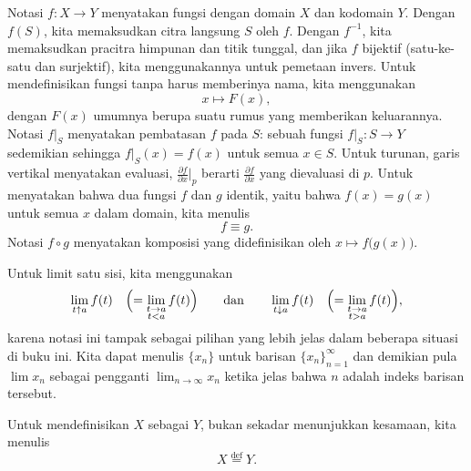 \documentclass[12pt,openany]{book}
\theoremstyle{plain}
\theoremstyle{remark}
\theoremstyle{definition}
\theoremstyle{exercise}
\theoremstyle{example}
\begin{document}
%
Notasi $f \colon X \to Y$ menyatakan fungsi dengan domain $X$ dan
kodomain $Y$.  Dengan $f(S)$, kita memaksudkan citra langsung $S$ oleh $f$.
Dengan $f^{-1}$, kita memaksudkan pracitra himpunan dan
titik tunggal, dan jika $f$ bijektif (satu-ke-satu dan surjektif),
kita menggunakannya untuk pemetaan invers.
Untuk mendefinisikan fungsi tanpa harus memberinya nama, kita menggunakan
%
\begin{equation*}
x \mapsto F(x) ,
\end{equation*}
dengan $F(x)$ umumnya berupa suatu rumus yang memberikan keluarannya.
Notasi
%
$f|_S$
menyatakan pembatasan $f$ pada $S$:
sebuah fungsi
$f|_S \colon S \to Y$ sedemikian sehingga $f|_S(x) = f(x)$ untuk semua $x \in S$.
Untuk turunan, garis vertikal menyatakan evaluasi,
$\frac{\partial f}{\partial x}\big|_p$ berarti
$\frac{\partial f}{\partial x}$ yang dievaluasi di $p$.
Untuk menyatakan bahwa dua fungsi $f$ dan $g$ identik,
yaitu bahwa $f(x) = g(x)$ untuk semua $x$ dalam domain,
kita menulis
%
\begin{equation*}
f \equiv g .
\end{equation*}
Notasi
%
$f \circ g$
menyatakan komposisi yang didefinisikan oleh $x \mapsto f\bigl(g(x)\bigr)$.

Untuk limit satu sisi, kita menggunakan
%
%
\begin{equation*}
\lim_{t \uparrow a} f(t) \quad \Bigl( = \lim_{\substack{t \to a\\t < a}} f(t)
\Bigr)
\qquad \text{dan} \qquad
\lim_{t \downarrow a} f(t) \quad \Bigl( = \lim_{\substack{t \to a\\t > a}} f(t)
\Bigr) ,
\end{equation*}
karena notasi ini tampak sebagai pilihan yang lebih jelas dalam beberapa situasi di buku ini.
Kita dapat menulis $\{ x_n \}$ untuk barisan $\{x_n\}_{n=1}^\infty$ dan demikian pula
$\lim x_n$ sebagai pengganti $\lim_{n\to \infty} x_n$ ketika jelas bahwa $n$ adalah
indeks barisan tersebut.

Untuk mendefinisikan $X$ sebagai $Y$, bukan sekadar menunjukkan kesamaan, kita menulis
%
\begin{equation*}
X
\overset{\text{def}}{=}
Y .
\end{equation*}

\end{document}
